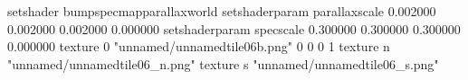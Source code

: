 setshader bumpspecmapparallaxworld
setshaderparam parallaxscale 0.002000 0.002000 0.002000 0.000000
setshaderparam specscale 0.300000 0.300000 0.300000 0.000000
texture 0 "unnamed/unnamedtile06b.png" 0 0 0 1
texture n "unnamed/unnamedtile06_n.png"
texture s "unnamed/unnamedtile06_s.png"